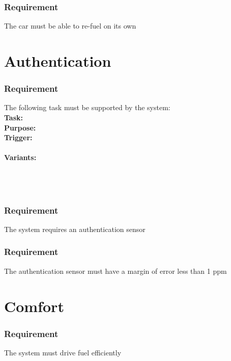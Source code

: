 \documentclass{article}
\begin{document}
{      \subsubsection{Requirement}
\hfill \break 
\- \- \-The car must be able to re-fuel on its own

\section{Authentication}
\subsubsection {Requirement}
\hfill \break 
\- \- \-The following task must be supported by the system:\\
\hfill \break 
\textbf{Task:} \\
\textbf{Purpose:} \\
\textbf{Trigger:} \\
\\
\noindent
\textbf{Variants:}     \\
\tab{ }  \\
\tab{ }  \\
\tab{ }  \\
\tab{ }   
\bigskip

    \subsubsection{Requirement}
\hfill \break 
\- \- \-The system requires an authentication sensor
    \subsubsection{Requirement}
\hfill \break 
\- \- \-The authentication sensor must have a margin of error less than 1 ppm

\section{Comfort}
    \subsubsection{Requirement}
\hfill \break 
\- \- \-The system must drive fuel efficiently
}
\end{document}
